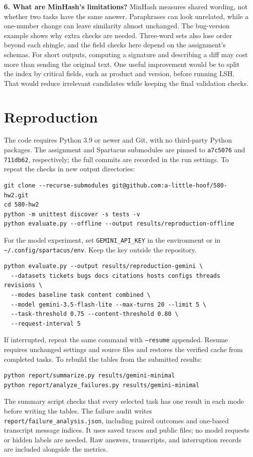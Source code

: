 \documentclass[10pt]{article}
\begin{document}
\textbf{6. What are MinHash's limitations?}
MinHash measures shared wording, not whether two tasks have the same answer.
Paraphrases can look unrelated, while a one-number change can leave similarity
almost unchanged. The bug-version example shows why extra checks are needed.
Three-word sets also lose order beyond each shingle, and the field checks here
depend on the assignment's schemas. For short outputs, computing a signature
and describing a diff may cost more than sending the original text. One useful
improvement would be to split the index by critical fields, such as product and
version, before running LSH. That would reduce irrelevant candidates while
keeping the final validation checks.

\section{Reproduction}
The code requires Python 3.9 or newer and Git, with no third-party Python
packages. The assignment and Spartacus submodules are pinned to
\texttt{a7c5076} and \texttt{711db62}, respectively; the full commits are recorded
in the run settings. To repeat the checks in new output directories:
\begin{lstlisting}
git clone --recurse-submodules git@github.com:a-little-hoof/580-hw2.git
cd 580-hw2
python -m unittest discover -s tests -v
python evaluate.py --offline --output results/reproduction-offline
\end{lstlisting}
For the model experiment, set \texttt{GEMINI\_API\_KEY} in the environment or
in \nolinkurl{~/.config/spartacus/env}. Keep the key outside the repository.
\begin{lstlisting}
python evaluate.py --output results/reproduction-gemini \
  --datasets tickets bugs docs citations hosts configs threads revisions \
  --modes baseline task content combined \
  --model gemini-3.5-flash-lite --max-turns 20 --limit 5 \
  --task-threshold 0.75 --content-threshold 0.80 \
  --request-interval 5
\end{lstlisting}
If interrupted, repeat the same command with \texttt{--resume} appended.
Resume requires unchanged settings and source files and restores the verified
cache from completed tasks. To rebuild the tables from the submitted results:
\begin{lstlisting}
python report/summarize.py results/gemini-minimal
python report/analyze_failures.py results/gemini-minimal
\end{lstlisting}
The summary script checks that every selected task has one result in each
mode before writing the tables. The failure audit writes
\nolinkurl{report/failure_analysis.json}, including paired outcomes and
one-based transcript message indices. It uses saved traces and public files;
no model requests or hidden labels are needed. Raw answers, transcripts, and
interruption records are included alongside the metrics.
\end{document}
